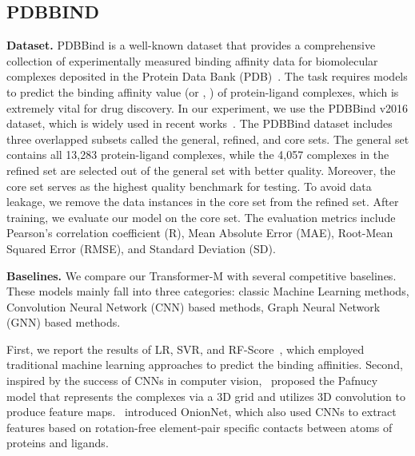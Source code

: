 \documentclass{article} \usepackage[dvipsnames]{xcolor}
\begin{document}
\subsection{PDBBIND}
\vspace{-5pt}
\label{app:pdbbind}
\textbf{Dataset.} 
PDBBind is a well-known dataset that provides a comprehensive collection of experimentally measured binding affinity data for biomolecular complexes deposited in the Protein Data Bank (PDB)~\citep{2005The}. The task requires models to predict the binding affinity value  (or , ) of protein-ligand complexes, which is extremely vital for drug discovery. In our experiment, we use the PDBBind v2016 dataset, which is widely used in recent works~\citep{li2021structure}. The PDBBind dataset includes three overlapped subsets called the general, refined, and core sets. The general set contains all 13,283 protein-ligand complexes, while the 4,057 complexes in the refined set are selected out of the general set with better quality. Moreover, the core set serves as the highest quality benchmark for testing. To avoid data leakage, we remove the data instances in the core set from the refined set. After training, we evaluate our model on the core set. The evaluation metrics include Pearson's correlation coefficient (R), Mean Absolute Error (MAE), Root-Mean Squared Error (RMSE), and Standard Deviation (SD).
 
\textbf{Baselines.}
We compare our Transformer-M with several competitive baselines. These models mainly fall into three categories: classic Machine Learning methods, Convolution Neural Network (CNN) based methods, Graph Neural Network (GNN) based methods.

First, we report the results of LR, SVR, and RF-Score~\citep{Ballester2010A}, which employed traditional machine learning approaches to predict the binding affinities. Second, inspired by the success of CNNs in computer vision,~\citet{stepniewska2018development} proposed the Pafnucy model that represents the complexes via a 3D grid and utilizes 3D convolution to produce feature maps.~\citet{2019OnionNet} introduced OnionNet, which also used CNNs to extract features based on rotation-free element-pair specific contacts between 
atoms of proteins and ligands.
\end{document}
